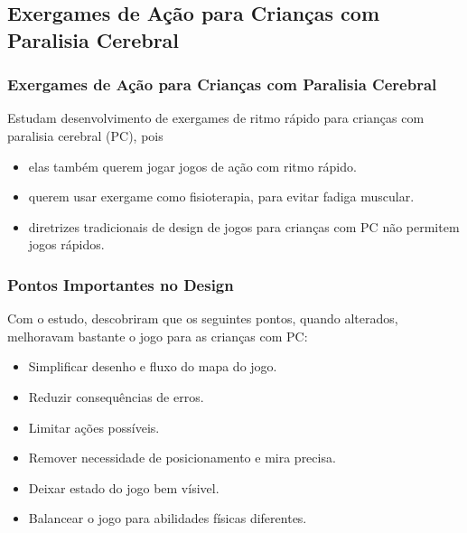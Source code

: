 \documentclass[brazil]{beamer}
\begin{document}
\subsection{Exergames de Ação para Crianças com Paralisia Cerebral}
\begin{frame}
  \frametitle{Exergames de Ação para Crianças com Paralisia Cerebral}
  \vspace{-10pt}
  Estudam desenvolvimento de exergames de ritmo rápido para crianças com paralisia
  cerebral (PC), pois  
  \vspace{10pt}
  \pause
  \begin{itemize}
    \item elas também querem jogar jogos de ação com ritmo rápido.
    \vspace{10pt}
    \item querem usar exergame como fisioterapia, para evitar fadiga muscular.
    \vspace{10pt}
    \item diretrizes tradicionais de design de jogos para crianças com PC não permitem jogos rápidos.
  \end{itemize}
\end{frame}
\begin{frame}
  \frametitle{Pontos Importantes no Design}
  \vspace{-10pt}
  Com o estudo, descobriram que os seguintes pontos, quando alterados, melhoravam 
  bastante o jogo para as crianças com PC:
  \vspace{10pt}
  \begin{itemize}
    \item Simplificar desenho e fluxo do mapa do jogo.
    \vspace{10pt}
    \item Reduzir consequências de erros.
    \vspace{10pt}
    \item Limitar ações possíveis.
    \vspace{10pt}
    \item Remover necessidade de posicionamento e mira precisa.
    \vspace{10pt}
    \item Deixar estado do jogo bem vísivel.
    \vspace{10pt}
    \item Balancear o jogo para abilidades físicas diferentes.
  \end{itemize}
\end{frame}
\end{document}
